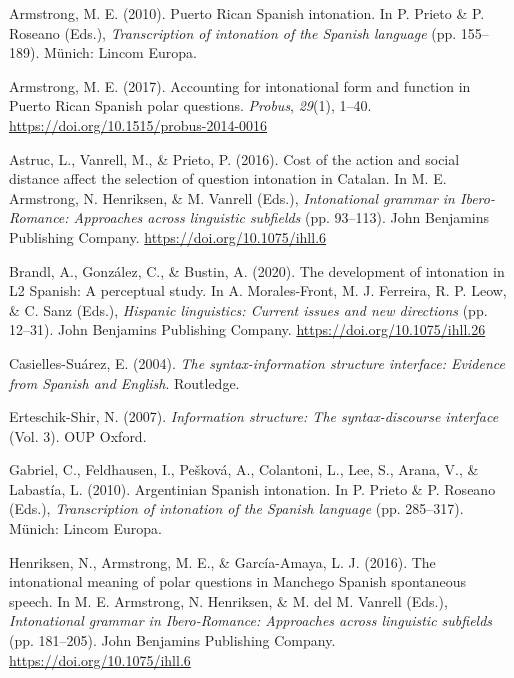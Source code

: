 \documentclass[]{article}
\newlength{\cslhangindent}
\newenvironment{CSLReferences}[2] %
 {%
  \setlength{\parindent}{0pt}
  \ifodd #1 \everypar{\setlength{\hangindent}{\cslhangindent}}\ignorespaces\fi
  \ifnum #2 > 0
  \setlength{\parskip}{#2\baselineskip}
  \fi
 }%
 {}
\begin{document}
\hypertarget{refs}{}
\begin{CSLReferences}{1}{0}
\leavevmode{}%
Armstrong, M. E. (2010). Puerto {R}ican {S}panish intonation. In P. Prieto \& P. Roseano (Eds.), \emph{Transcription of intonation of the {S}panish language} (pp. 155--189). Münich: Lincom Europa.

\leavevmode{}%
Armstrong, M. E. (2017). Accounting for intonational form and function in {P}uerto {R}ican {S}panish polar questions. \emph{Probus}, \emph{29}(1), 1--40. \url{https://doi.org/10.1515/probus-2014-0016}

\leavevmode{}%
Astruc, L., Vanrell, M., \& Prieto, P. (2016). Cost of the action and social distance affect the selection of question intonation in {C}atalan. In M. E. Armstrong, N. Henriksen, \& M. Vanrell (Eds.), \emph{Intonational grammar in {I}bero-{R}omance: {A}pproaches across linguistic subfields} (pp. 93--113). John Benjamins Publishing Company. \url{https://doi.org/10.1075/ihll.6}

\leavevmode{}%
Brandl, A., González, C., \& Bustin, A. (2020). The development of intonation in {L}2 {S}panish: {A} perceptual study. In A. Morales-Front, M. J. Ferreira, R. P. Leow, \& C. Sanz (Eds.), \emph{Hispanic linguistics: Current issues and new directions} (pp. 12--31). John Benjamins Publishing Company. \url{https://doi.org/10.1075/ihll.26}

\leavevmode{}%
Casielles-Suárez, E. (2004). \emph{The syntax-information structure interface: {E}vidence from {S}panish and {E}nglish}. Routledge.

\leavevmode{}%
Erteschik-Shir, N. (2007). \emph{Information structure: {T}he syntax-discourse interface} (Vol. 3). OUP Oxford.

\leavevmode{}%
Gabriel, C., Feldhausen, I., Pešková, A., Colantoni, L., Lee, S., Arana, V., \& Labastía, L. (2010). {A}rgentinian {S}panish intonation. In P. Prieto \& P. Roseano (Eds.), \emph{Transcription of intonation of the {S}panish language} (pp. 285--317). Münich: Lincom Europa.

\leavevmode{}%
Henriksen, N., Armstrong, M. E., \& García-Amaya, L. J. (2016). The intonational meaning of polar questions in {M}anchego {S}panish spontaneous speech. In M. E. Armstrong, N. Henriksen, \& M. del M. Vanrell (Eds.), \emph{Intonational grammar in {I}bero-{R}omance: {A}pproaches across linguistic subfields} (pp. 181--205). John Benjamins Publishing Company. \url{https://doi.org/10.1075/ihll.6}


\end{CSLReferences}
\end{document}
